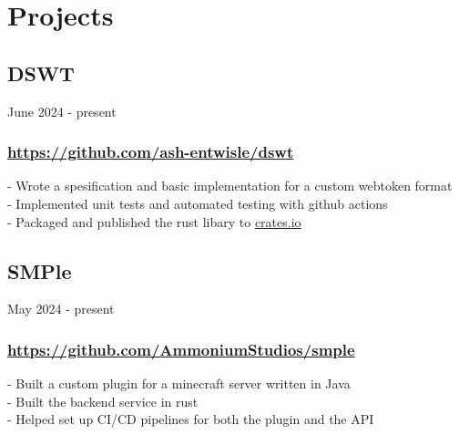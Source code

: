 \newpage

\section{Projects}



\subsection{DSWT} June 2024 - present \\
\subsubsection{\href{https://github.com/ash-entwisle/dswt}{https://github.com/ash-entwisle/dswt} }
-\:  Wrote a spesification and basic implementation for a custom webtoken format \\
-\:  Implemented unit tests and automated testing with github actions \\
-\:  Packaged and published the rust libary to \href{https://crates.io/}{crates.io} \\ 

\subsection{SMPle} May 2024 - present \\
\subsubsection{\href{https://github.com/AmmoniumStudios/smple}{https://github.com/AmmoniumStudios/smple}}
-\:  Built a custom plugin for a minecraft server written in Java \\
-\:  Built the backend service in rust \\
-\:  Helped set up CI/CD pipelines for both the plugin and the API \\

